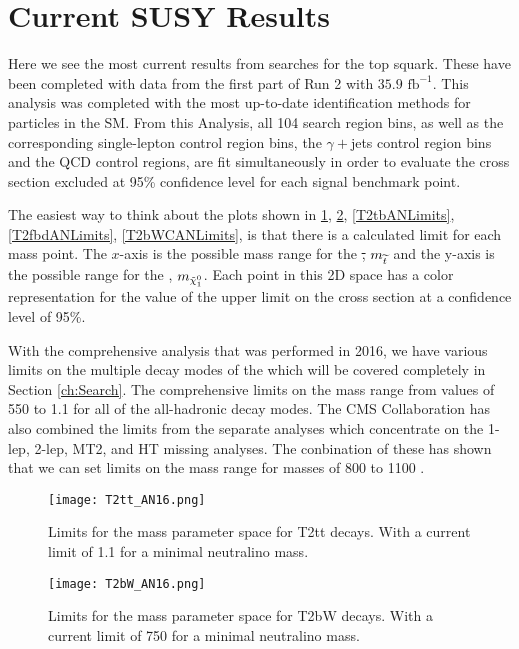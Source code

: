 \section{Current SUSY Results}\label{CurrentResults}

Here we see the most current results from searches for the top squark. These have been completed with data from the first part of Run 2 with $35.9 \text{ fb}^{-1}$. This analysis was completed with the most up-to-date identification methods for particles in the SM. From this Analysis, all 104 search region bins, as well as the corresponding single-lepton control region bins, the $\gamma+$jets control region bins and the QCD control regions, are fit simultaneously in order to evaluate the cross section excluded at 95\% confidence level for each signal benchmark point. 

The easiest way to think about the plots shown in \ref{T2ttANLimits}, \ref{T2bWANLimits}, \ref{T2tbANLimits}, \ref{T2fbdANLimits}, \ref{T2bWCANLimits}, is that there is a calculated limit for each mass point. The $x$-axis is the possible mass range for the \st, $m_{\widetilde{t}}$ and the y-axis is the possible range for the \neutralino, $m_{\tilde{\chi}^{0}_{1}}$. Each point in this 2D space has a color representation for the value of the upper limit on the cross section at a confidence level of 95\%. 

With the comprehensive analysis that was performed in 2016, we have various limits on the multiple decay modes of the \st{} which will be covered completely in Section \ref{ch:Search}. The comprehensive limits on the \st{} mass range from values of 550 to 1.1 \TeV{} for all of the all-hadronic decay modes. The CMS Collaboration has also combined the limits from the separate analyses which concentrate on the 1-lep, 2-lep, MT2, and HT missing analyses. The conbination of these has shown that we can set limits on the \st{} mass range for masses of 800 to 1100 \GeV. 

\begin{figure}
\centering
	\texttt{[image: T2tt\_AN16.png]}
 	\caption[T2tt Limits]{Limits for the mass parameter space for T2tt decays. With a current limit of 1.1 \TeV{} for a minimal neutralino mass.}
 	\label{T2ttANLimits} 
\end{figure}

\begin{figure}
\centering
	\texttt{[image: T2bW\_AN16.png]}
 	\caption[T2bW Limits]{Limits for the mass parameter space for T2bW decays. With a current limit of 750 \GeV{} for a minimal neutralino mass.}
 	\label{T2bWANLimits} 
\end{figure}

